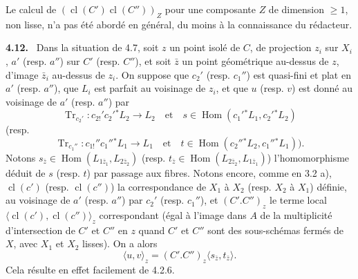 \documentclass[11pt]{article}
\newenvironment{statement}[1]{\par\medskip\noindent\textbf{#1.}\ }{\par\medskip}
\DeclareMathOperator{\Hom}{Hom}
\providecommand{\cl}{\operatorname{cl}}
\providecommand{\Tr}{\operatorname{Tr}}
\providecommand{\Tr}{\operatorname{Tr}}
\providecommand{\Tr}{\operatorname{Tr}}
\providecommand{\Hom}{\operatorname{Hom}}
\providecommand{\Tr}{\operatorname{Tr}}
\providecommand{\cl}{\operatorname{cl}}
\providecommand{\Hom}{\operatorname{Hom}}
\providecommand{\cl}{\operatorname{cl}}
\providecommand{\Tr}{\operatorname{Tr}}
\begin{document}
Le calcul de $(\cl(C')\cl(C''))_Z$ pour une composante $Z$ de dimension $\geq 1$, non lisse, n'a pas été abordé en général, du moins à la connaissance du rédacteur.

\begin{statement}{4.12}
Dans la situation de 4.7, soit $z$ un point isolé de $C$, de projection $z_i$ sur $X_i$, $a'$ (resp. $a''$) sur $C'$ (resp. $C''$), et soit $\bar z$ un point géométrique au-dessus de $z$, d'image $\bar z_i$ au-dessus de $z_i$. On suppose que $c_2'$ (resp. $c_1''$) est quasi-fini et plat en $a'$ (resp. $a''$), que $L_i$ est parfait au voisinage de $z_i$, et que $u$ (resp. $v$) est donné au voisinage de $a'$ (resp. $a''$) par
\[
\Tr_{c_2'}:c_{2!}'c_2'{}^*L_2\longrightarrow L_2
\quad\text{et}\quad
s\in\Hom(c_1'{}^*L_1,c_2'{}^*L_2)
\]
(resp.
\[
\Tr_{c_1''}:c_{1!}''c_1''{}^*L_1\longrightarrow L_1
\quad\text{et}\quad
t\in\Hom(c_2''{}^*L_2,c_1''{}^*L_1)).
\]
Notons $s_{\bar z}\in\Hom(L_{1\bar z_1},L_{2\bar z_2})$ (resp. $t_{\bar z}\in\Hom(L_{2\bar z_2},L_{1\bar z_1})$) l'homomorphisme déduit de $s$ (resp. $t$) par passage aux fibres. Notons encore, comme en 3.2 a), $\cl(c')$ (resp. $\cl(c'')$) la correspondance de $X_1$ à $X_2$ (resp. $X_2$ à $X_1$) définie, au voisinage de $a'$ (resp. $a''$) par $c_2'$ (resp. $c_1''$), et $(C'.C'')_z$ le terme local $\langle\cl(c'),\cl(c'')\rangle_z$ correspondant (égal à l'image dans $A$ de la
multiplicité d'intersection de $C'$ et $C''$ en $z$ quand $C'$ et $C''$ sont des sous-schémas fermés de $X$, avec $X_1$ et $X_2$ lisses). On a alors
\begin{equation}
\tag{4.12.1}
\langle u,v\rangle_z=(C'.C'')_z\langle s_{\bar z},t_{\bar z}\rangle.
\end{equation}
Cela résulte en effet facilement de 4.2.6.
\end{statement}
\end{document}

